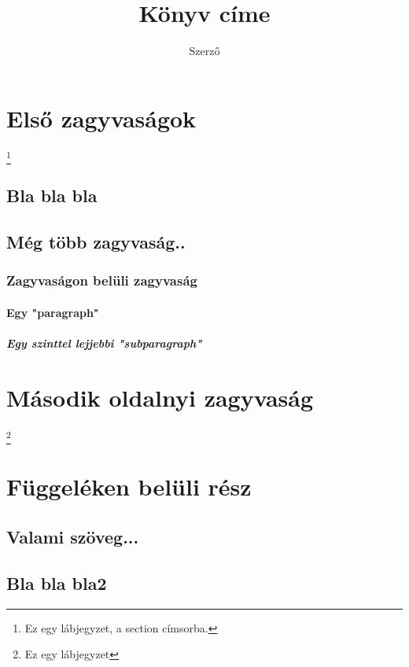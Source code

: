 \documentclass[twocolumn]{book}
\begin{document}
\title{Könyv címe}
\author{Szerző}
\maketitle

\pagestyle{headings}
\pagestyle{myheadings}

\def\ps@headings{
  \def\@oddhead{\rightmark}  %
  \def\@evenhead{\leftmark}  %
  \def\@oddfoot{}
  \def\@evenfoot{}
}


\tableofcontents
\newpage

\section[zagyvaság]{Első zagyvaságok}
\footnote{Ez egy lábjegyzet, a section címsorba.}
\subsection{Bla bla bla}
\hulipsum[2]
\subsection{Még több zagyvaság..}
\hulipsum[2]
\subsubsection{Zagyvaságon belüli zagyvaság}
\paragraph{Egy "paragraph"}
\subparagraph{Egy szinttel lejjebbi "subparagraph"}
\newpage
\section{Második oldalnyi zagyvaság}
\hulipsum[2-3] \linebreak
\footnote{Ez egy lábjegyzet}

\appendix
\section{Függeléken belüli rész}
\subsection{Valami szöveg...}
\subsection{Bla bla bla2}
\end{document}
